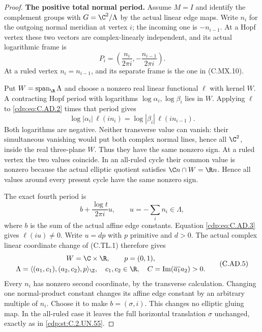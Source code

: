 \begin{proof}
\par\medskip\noindent\textbf{The positive total normal period.}
Assume $M=I$ and identify the complement groups with
$G=\C^2/\Lambda$ by the actual linear edge maps. Write $n_i$
for the outgoing normal meridian at vertex $i$; the incoming
one is $-n_{i-1}$. At a Hopf vertex these two vectors are
complex-linearly independent, and its actual logarithmic frame is
\[
       P_i=\left(\frac{n_i}{2\pi i},
                         -\frac{n_{i-1}}{2\pi i}\right).
                                                        \tag{C.AD.2}\label{cdp:eq:C.AD.2}
\]
At a ruled vertex $n_i=n_{i-1}$, and its separate frame is the
one in (C.MX.10).

Put $W=\operatorname{span}_{\R}\Lambda$ and choose a nonzero
real linear functional $\ell$ with kernel $W$. A contracting
Hopf period with logarithms $\log\alpha_i,\log\beta_i$ lies
in $W$. Applying $\ell$ to \eqref{cdp:eq:C.AD.2} times that period gives
\[
 \log|\alpha_i|\,\ell(i n_i)
       =\log|\beta_i|\,\ell(i n_{i-1}).                 \tag{C.AD.3}\label{cdp:eq:C.AD.3}
\]
Both logarithms are negative. Neither transverse value can
vanish: their simultaneous vanishing would put both complex
normal lines, hence all $\C^2$, inside the real three-plane
$W$. Thus they have the same nonzero sign. At a ruled vertex
the two values coincide. In an all-ruled cycle their common
value is nonzero because the actual elliptic quotient satisfies
$\C n\cap W=\R n$. Hence all values around every present
cycle have the same nonzero sign.

The exact fourth period is
\[
 b+\frac{\log t}{2\pi i}u,\qquad
             u=-\sum_i n_i\in\Lambda,
                                                        \tag{C.AD.4}\label{cdp:eq:C.AD.4}
\]
where $b$ is the sum of the actual affine edge constants.
Equation \eqref{cdp:eq:C.AD.3} gives $\ell(iu)\ne0$. Write $u=d p$ with
$p$ primitive and $d>0$. The actual complex linear coordinate
change of (C.TL.1) therefore gives
\[
 \begin{gathered}
 W=\C\times\R,\qquad p=(0,1),\\
 \Lambda=\langle (a_1,c_1),(a_2,c_2),p\rangle_{\Z},
 \quad c_1,c_2\in\R,\quad
 C=\operatorname{Im}(\overline{a_1}a_2)>0.
 \end{gathered}                                        \tag{C.AD.5}\label{cdp:eq:C.AD.5}
\]
Every $n_i$ has nonzero second coordinate, by the transverse
calculation. Changing one normal-product constant changes
its affine edge constant by an arbitrary multiple of $n_i$.
Choose it to make $b=(\sigma,i)$. This changes no elliptic
gluing map. In the all-ruled case it leaves the full horizontal
translation $\sigma$ unchanged, exactly as in \ref{cdp:st:C.2.UN.55}.


\end{proof}
